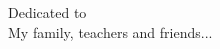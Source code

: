 \thispagestyle{empty}%
\vspace*{0.4\textheight}
\begin{center}
{ {\sf Dedicated to}}\\
\vspace*{0.5\baselineskip}
{ {\sf My family, teachers and friends...}}\\
\end{center}
